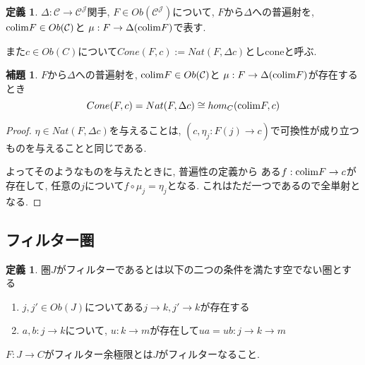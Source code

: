 \documentclass[dvipdfmx,a4paper,11pt]{report}
\newcommand{\colim}{{\rm colim}}
\theoremstyle{definition}
\newtheorem{lem}[thm]{補題}
\newtheorem{dfn}[thm]{定義}
\begin{document}
 \begin{tcolorbox}
 [colback = white, colframe = green!35!black, fonttitle = \bfseries,breakable = true]
\begin{dfn}
$\Delta : \mathcal{C} \to \mathcal{C}^{\mathcal{J}}$関手, 
$F \in Ob(\mathcal{C}^{\mathcal{J}})$について, 
$F$から$\Delta $への普遍射を, 
$\colim F \in Ob(\mathcal{C})$と $\mu: F \to \Delta (\colim F)$で表す.

また$c \in Ob(C)$について$Cone(F,c):= Nat(F,\Delta c)$としconeと呼ぶ.
\end{dfn}
\end{tcolorbox}


 \begin{tcolorbox}
 [colback = white, colframe = green!35!black, fonttitle = \bfseries,breakable = true]
\begin{lem}
$F$から$\Delta $への普遍射を, 
$\colim F \in Ob(\mathcal{C})$と $\mu: F \to \Delta (\colim F)$が存在するとき
$$
Cone(F,c) = Nat(F,\Delta c) \cong hom_{C}( \colim F , c)
$$
\end{lem}
\end{tcolorbox}
\begin{proof}
$\eta \in  Nat(F,\Delta c)$を与えることは, 
$(c, \eta_j : F(j) \to c)$で可換性が成り立つものを与えることと同じである.  

よってそのようなものを与えたときに, 普遍性の定義から
ある$ f:  \colim F \to c$が存在して, 任意の$j$について$f  \circ \mu_j = \eta_j$となる.
 これはただ一つであるので全単射となる. 
\end{proof}

\subsection{フィルター圏}

 \begin{tcolorbox}
 [colback = white, colframe = green!35!black, fonttitle = \bfseries,breakable = true]
\begin{dfn}
圏$J$がフィルターであるとは以下の二つの条件を満たす空でない圏とする
\begin{enumerate}
\item $j, j' \in Ob(J)$についてある$j \to k, j' \to k$が存在する
\item $a, b: j \to k$について, $u: k \to m$が存在して$ua = ub : j \to k \to m$
\end{enumerate}

$F : J \to C$がフィルター余極限とは$J$がフィルターなること.
\end{dfn}
\end{tcolorbox}
\end{document}
